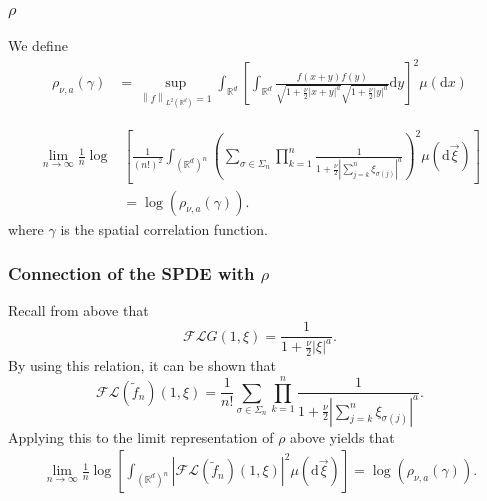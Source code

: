 \documentclass{beamer}%
\numberwithin{equation}{section}
\newcommand{\R}{\mathbb{R}}
\newcommand{\Norm}[1]{\left\|  #1   \right\|}
\newcommand{\ud}{\ensuremath{\mathrm{d} }}
\begin{document}
		
	\begin{frame}[t]
		\frametitle{$\rho$}
		We define
		\begin{align*}
		\rho_{\nu,a}(\gamma) &= \sup_{\Norm{f}_{L^2(\R^d)} =1} \int_{\R^d} \left[ \int_{\R^d} \frac{f(x+y)f(y)}{\sqrt{1+\frac{\nu}{2}|x+y|^a } \sqrt{1+\frac{\nu}{2}|y|^a} } \ud y \right]^2 \mu(\ud x)
		\end{align*}
		
		
		
		
		\begin{theorem}
			\begin{align*}
			\lim_{n \to \infty} \frac{1}{n} \log & \left[ \frac{1}{(n!)^2} \int_{(\R^d)^n} \left( \sum_{\sigma \in \Sigma_n} \prod_{k=1}^n \frac{1}{1+ \frac{\nu}{2}|\sum_{j=k}^n \xi_{\sigma(j)}|^a}\right)^2 \mu (\ud \vec{\xi})\right]
			\\& = \log\left( \rho_{\nu, a}\left(\gamma\right) \right).
			\end{align*}
			where $\gamma$ is the spatial correlation function.
		\end{theorem}
		
	\end{frame}
	
	\begin{frame}[t]
		\frametitle{Connection of the SPDE with $\rho$}
		Recall from above that
		\[
		\mathcal{F}\mathcal{L}G(1,\xi) = \frac{1}{1+\frac{\nu}{2}|\xi|^a}.
		\]
		By using this relation, it can be shown that
		\[
		\mathcal{F}\mathcal{L}(\tilde{f}_n)(1,\xi) = \frac{1}{n!} \sum_{\sigma \in \Sigma_n} \prod_{k=1}^n \frac{1}{1+ \frac{\nu}{2}|\sum_{j=k}^n \xi_{\sigma(j)}|^a}.
		\]
		Applying this to the limit representation of $\rho$ above yields that
		\begin{align*}
		\lim_{n \to \infty} \frac{1}{n} \log  \left[ \int_{(\R^d)^n} \left| \mathcal{F}\mathcal{L}(\tilde{f}_n)(1,\xi)\right|^2 \mu (\ud \vec{\xi})\right]  = \log\left( \rho_{\nu, a}\left(\gamma\right) \right).
		\end{align*}
	\end{frame}
	
\end{document}
